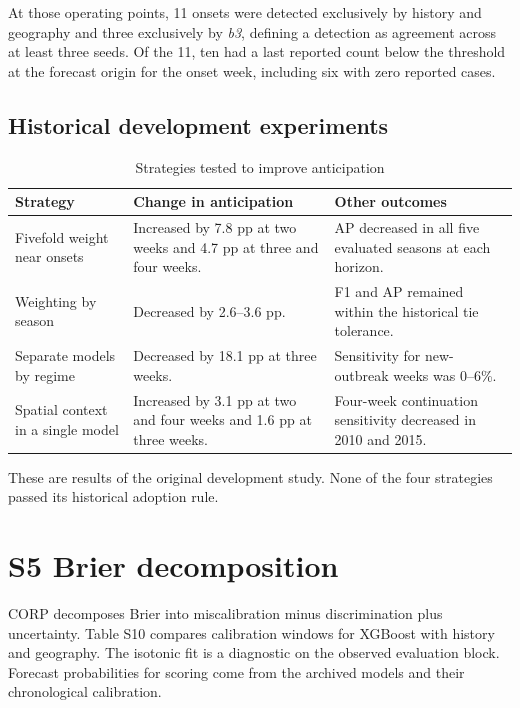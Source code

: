 \documentclass[10pt]{article}
\newcommand{\bthree}{\textit{b3}}
\begin{document}
At those operating points, 11 onsets were detected exclusively by history and geography and three exclusively by \bthree{}, defining a detection as agreement across at least three seeds. Of the 11, ten had a last reported count below the threshold at the forecast origin for the onset week, including six with zero reported cases.

\subsection*{Historical development experiments}
\begin{table}[!h]
\centering
\caption{Strategies tested to improve anticipation}
\small
\begin{tabular}{@{}p{}p{}p{}@{}}
\toprule
Strategy & Change in anticipation & Other outcomes\\
\midrule
Fivefold weight near onsets & Increased by 7.8 pp at two weeks and 4.7 pp at three and four weeks. & AP decreased in all five evaluated seasons at each horizon.\\
Weighting by season & Decreased by 2.6--3.6 pp. & F1 and AP remained within the historical tie tolerance.\\
Separate models by regime & Decreased by 18.1 pp at three weeks. & Sensitivity for new-outbreak weeks was 0--6\%.\\
Spatial context in a single model & Increased by 3.1 pp at two and four weeks and 1.6 pp at three weeks. & Four-week continuation sensitivity decreased in 2010 and 2015.\\
\bottomrule
\end{tabular}

\vspace{2pt}\parbox{0.9\textwidth}{\footnotesize These are results of the original development study. None of the four strategies passed its historical adoption rule.}
\end{table}

\clearpage
\section*{S5 Brier decomposition}
CORP decomposes Brier into miscalibration minus discrimination plus uncertainty. Table S10 compares calibration windows for XGBoost with history and geography. The isotonic fit is a diagnostic on the observed evaluation block. Forecast probabilities for scoring come from the archived models and their chronological calibration.
\end{document}
